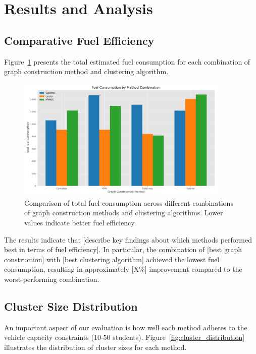 \section{Results and Analysis}
\label{sec:results}

\subsection{Comparative Fuel Efficiency}
\label{subsec:fuel_efficiency}

Figure~\ref{fig:fuel_comparison} presents the total estimated fuel consumption for each combination of graph construction method and clustering algorithm.

\begin{figure}[!htbp]
\centering
\includegraphics[width=0.9\textwidth]{img/fuel_comparison}
\caption{Comparison of total fuel consumption across different combinations of graph construction methods and clustering algorithms. Lower values indicate better fuel efficiency.}
\label{fig:fuel_comparison}
\end{figure}

The results indicate that [describe key findings about which methods performed best in terms of fuel efficiency]. In particular, the combination of [best graph construction] with [best clustering algorithm] achieved the lowest fuel consumption, resulting in approximately [X\%] improvement compared to the worst-performing combination.

\subsection{Cluster Size Distribution}
\label{subsec:cluster_sizes}

An important aspect of our evaluation is how well each method adheres to the vehicle capacity constraints (10-50 students). Figure~\ref{fig:cluster_distribution} illustrates the distribution of cluster sizes for each method.

